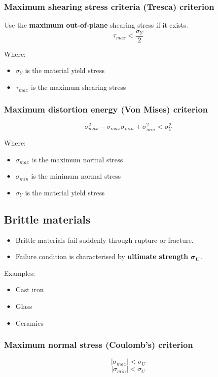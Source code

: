 \documentclass[11pt]{article}
\begin{document}
\subsubsection{Maximum shearing stress criteria (Tresca) criterion}
\label{sec:org0c2c1f3}
Use the \textbf{maximum out-of-plane} shearing stress if it exists.
\[\tau_{max} < \frac{\sigma_Y}{2}\]

Where:
\begin{itemize}
\item \(\sigma_Y\) is the material yield stress
\item \(\tau_{max}\) is the maximum shearing stress
\end{itemize}

\subsubsection{Maximum distortion energy (Von Mises) criterion}
\label{sec:orgdc6528b}
\[\sigma_{max}^2 - \sigma_{max} \sigma_{min} + \sigma_{min}^2 < \sigma_Y^2\]

Where:
\begin{itemize}
\item \(\sigma_{max}\) is the maximum normal stress
\item \(\sigma_{min}\) is the minimum normal stress
\item \(\sigma_{Y}\) is the material yield stress
\end{itemize}

\newpage

\subsection{Brittle materials}
\label{sec:orgce901b6}
\begin{itemize}
\item Brittle materials fail suddenly through rupture or fracture.
\item Failure condition is characterised by \textbf{ultimate strength \(\boldsymbol{\sigma_U}\)}.
\end{itemize}

Examples:
\begin{itemize}
\item Cast iron
\item Glass
\item Ceramics
\end{itemize}

\subsubsection{Maximum normal stress (Coulomb's) criterion}
\label{sec:org3412e1e}
\[|\sigma_{max}| < \sigma_U\]
\[|\sigma_{min}| < \sigma_U\]
\end{document}
